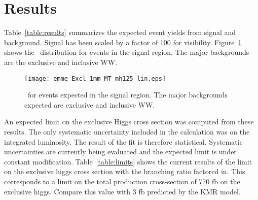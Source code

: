 \clearpage
\section{Results}
\label{sec:results}

\par Table~\ref{table:results} summarizes the expected event yields from signal 
and background. Signal has been scaled by a factor of 100 for visibility. 
Figure~\ref{fig:results} shows the \mt\ distribution for events in the signal region.
The major backgrounds are the exclusive and inclusive WW. 

\begin{table}
\centering
\caption{Main contributions to signal region contamination are inclusive WW and exclusive WW}
\label{table:results}
\end{table}

\begin{figure}
\centering
\texttt{[image: emme\_Excl\_1mm\_MT\_mh125\_lin.eps]}
\caption{\mt\ for events expected in the signal region. The major backgrounds
expected are exclusive and inclusive WW.}
\label{fig:results}
\end{figure}

\par An expected limit on the exclusive Higgs cross section was computed from these results. The only 
systematic uncertainty included in the calculation was on the integrated luminosity. The result of the 
fit is therefore statistical. Systematic uncertainties are currently being evaluated and the expected 
limit is under constant modification. Table~\ref{table:limits} shows the current results of the limit 
on the exclusive higgs cross section with the branching ratio factored in. This corresponds to a limit 
on the total production cross-section of 770 fb on the exclusive higgs. Compare this value with 3 fb 
predicted by the KMR model.   

